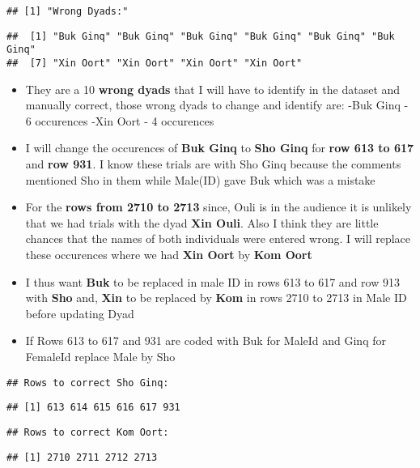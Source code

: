 \documentclass[
]{article}
\begin{document}
\begin{verbatim}
## [1] "Wrong Dyads:"
\end{verbatim}

\begin{verbatim}
##  [1] "Buk Ginq" "Buk Ginq" "Buk Ginq" "Buk Ginq" "Buk Ginq" "Buk Ginq"
##  [7] "Xin Oort" "Xin Oort" "Xin Oort" "Xin Oort"
\end{verbatim}

\begin{itemize}
\item
  They are a 10 \textbf{wrong dyads} that I will have to identify in the
  dataset and manually correct, those wrong dyads to change and identify
  are: -Buk Ginq - 6 occurences -Xin Oort - 4 occurences
\item
  I will change the occurences of \textbf{Buk Ginq} to \textbf{Sho Ginq}
  for \textbf{row 613 to 617} and \textbf{row 931}. I know these trials
  are with Sho Ginq because the comments mentioned Sho in them while
  Male(ID) gave Buk which was a mistake
\item
  For the \textbf{rows from 2710 to 2713} since, Ouli is in the audience
  it is unlikely that we had trials with the dyad \textbf{Xin Ouli}.
  Also I think they are little chances that the names of both
  individuals were entered wrong. I will replace these occurences where
  we had \textbf{Xin Oort} by \textbf{Kom Oort}
\item
  I thus want \textbf{Buk} to be replaced in male ID in rows 613 to 617
  and row 913 with \textbf{Sho} and, \textbf{Xin} to be replaced by
  \textbf{Kom} in rows 2710 to 2713 in Male ID before updating Dyad
\item
  If Rows 613 to 617 and 931 are coded with Buk for MaleId and Ginq for
  FemaleId replace Male by Sho
\end{itemize}

\begin{verbatim}
## Rows to correct Sho Ginq:
\end{verbatim}

\begin{verbatim}
## [1] 613 614 615 616 617 931
\end{verbatim}

\begin{verbatim}
## Rows to correct Kom Oort:
\end{verbatim}

\begin{verbatim}
## [1] 2710 2711 2712 2713
\end{verbatim}
\end{document}
